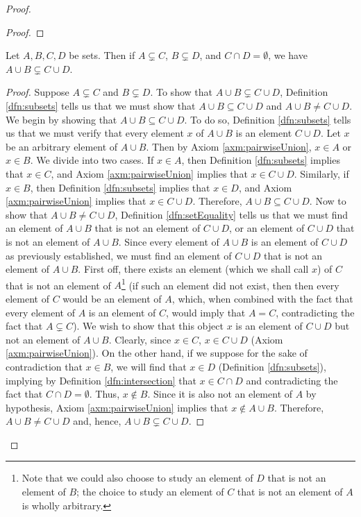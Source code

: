 \documentclass[../main.tex]{subfiles}
\begin{document}
\begin{enumerate}[ref={\thesection.\arabic*}]
\begin{proof}
\begin{lem}
\begin{proof}
            \end{proof}
        \end{lem}
        \begin{lem}\label{lem:unionSubsetsNeq}
            Let $A,B,C,D$ be sets. Then if $A\subsetneq C$, $B\subsetneq D$, and $C\cap D=\emptyset$, we have $A\cup B\subsetneq C\cup D$.
            \begin{proof}
                Suppose $A\subsetneq C$ and $B\subsetneq D$. To show that $A\cup B\subsetneq C\cup D$, Definition \ref{dfn:subsets} tells us that we must show that $A\cup B\subseteq C\cup D$ and $A\cup B\neq C\cup D$. We begin by showing that $A\cup B\subseteq C\cup D$. To do so, Definition \ref{dfn:subsets} tells us that we must verify that every element $x$ of $A\cup B$ is an element $C\cup D$. Let $x$ be an arbitrary element of $A\cup B$. Then by Axiom \ref{axm:pairwiseUnion}, $x\in A$ or $x\in B$. We divide into two cases. If $x\in A$, then Definition \ref{dfn:subsets} implies that $x\in C$, and Axiom \ref{axm:pairwiseUnion} implies that $x\in C\cup D$. Similarly, if $x\in B$, then Definition \ref{dfn:subsets} implies that $x\in D$, and Axiom \ref{axm:pairwiseUnion} implies that $x\in C\cup D$. Therefore, $A\cup B\subseteq C\cup D$. Now to show that $A\cup B\neq C\cup D$, Definition \ref{dfn:setEquality} tells us that we must find an element of $A\cup B$ that is not an element of $C\cup D$, or an element of $C\cup D$ that is not an element of $A\cup B$. Since every element of $A\cup B$ is an element of $C\cup D$ as previously established, we must find an element of $C\cup D$ that is not an element of $A\cup B$. First off, there exists an element (which we shall call $x$) of $C$ that is not an element of $A$\footnote{Note that we could also choose to study an element of $D$ that is not an element of $B$; the choice to study an element of $C$ that is not an element of $A$ is wholly arbitrary.} (if such an element did not exist, then then every element of $C$ would be an element of $A$, which, when combined with the fact that every element of $A$ is an element of $C$, would imply that $A=C$, contradicting the fact that $A\subsetneq C$). We wish to show that this object $x$ is an element of $C\cup D$ but not an element of $A\cup B$. Clearly, since $x\in C$, $x\in C\cup D$ (Axiom \ref{axm:pairwiseUnion}). On the other hand, if we suppose for the sake of contradiction that $x\in B$, we will find that $x\in D$ (Definition \ref{dfn:subsets}), implying by Definition \ref{dfn:intersection} that $x\in C\cap D$ and contradicting the fact that $C\cap D=\emptyset$. Thus, $x\notin B$. Since it is also not an element of $A$ by hypothesis, Axiom \ref{axm:pairwiseUnion} implies that $x\notin A\cup B$. Therefore, $A\cup B\neq C\cup D$ and, hence, $A\cup B\subsetneq C\cup D$.

\end{proof}
\end{lem}
\end{proof}
\end{enumerate}
\end{document}
